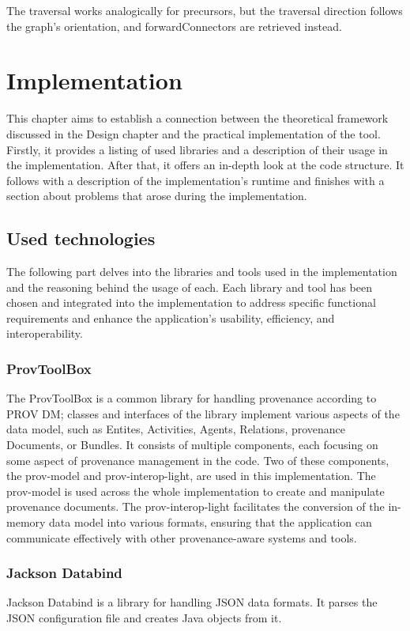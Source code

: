 \documentclass[
  digital,     %
  oneside,     %
  nosansbold,  %
  nocolorbold, %
  lof,         %
  lot,         %
]{fithesis4}
\begin{document}
The traversal works analogically for precursors, but the traversal direction follows the graph's orientation, and forwardConnectors are retrieved instead.


\chapter{Implementation}
\shorthandoff{-}
This chapter aims to establish a connection between the theoretical framework discussed in the Design chapter and the practical implementation of the tool. Firstly, it provides a listing of used libraries and a description of their usage in the implementation. After that, it offers an in-depth look at the code structure. It follows with a description of the implementation's runtime and finishes with a section about problems that arose during the implementation.

\section{Used technologies}
The following part delves into the libraries and tools used in the implementation and the reasoning behind the usage of each. Each library and tool has been chosen and integrated into the implementation to address specific functional requirements and enhance the application's usability, efficiency, and interoperability.

\subsection{ProvToolBox}
The ProvToolBox \cite{provtoolbox} is a common library for handling provenance according to PROV DM; classes and interfaces of the library implement various aspects of the data model, such as Entites, Activities, Agents, Relations, provenance Documents, or Bundles. It consists of multiple components, each focusing on some aspect of provenance management in the code. Two of these components, the prov-model and prov-interop-light, are used in this implementation. The prov-model is used across the whole implementation to create and manipulate provenance documents. The prov-interop-light facilitates the conversion of the in-memory data model into various formats, ensuring that the application can communicate effectively with other provenance-aware systems and tools.
\subsection{Jackson Databind}
Jackson Databind \cite{jackson} is a library for handling JSON data formats. It parses the JSON configuration file and creates Java objects from it.
\end{document}
